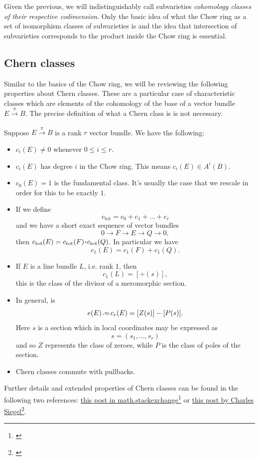 \documentclass[12pt]{memoir}
\begin{document}
Given the previous, we will indistinguishably call subvarieties \emph{cohomology classes of their respective codimension}. Only the basic idea of what the Chow ring as a set of isomorphism classes of subvarieties is and the idea that intersection of subvarieties corresponds to the product inside the Chow ring is essential.

\subsection{Chern classes}

Similar to the basics of the Chow ring, we will be reviewing the following properties about Chern classes. These are a particular case of characteristic classes which are elements of the cohomology of the base of a vector bundle $E\xrightarrow[]{\pi}B$. The precise definition of what a Chern class is is not necessary. 

\begin{Th}\label{th-chern-class-cheat-sheet}
    Suppose $E\xrightarrow{\pi}B$ is a rank $r$ vector bundle. We have the following:
\begin{itemize}
    \item $c_i(E)\neq 0$ whenever $0\leq i\leq r$.
    \item $c_i(E)$ has degree $i$ in the Chow ring. This means $c_i(E)\in A^i(B)$.
    \item $c_0(E)=1$ is the fundamental class. It's usually the case that we rescale in order for this to be exactly $1$.
    \item If we define 
    $$c_{\text{tot}}=c_0+c_1+\dots+c_r$$
    and we have a short exact sequence of vector bundles 
    $$0\to F\to E\to Q\to 0,$$
    then $c_{\text{tot}}(E)=c_{\text{tot}}(F)\.c_{\text{tot}}(Q)$. In particular we have 
    $$c_1(E)=c_1(F)+c_1(Q).$$
    \item If $E$ is a line bundle $L$, i.e. rank 1, then 
    $$c_1(L)=[\div(s)],$$
    this is the class of the divisor of a meromorphic section.
    \item In general,  is
    $$e(E)\defeq c_r(E)=[Z(s)]-[P(s)].$$%
    Here $s$ is a section which in local coordinates may be expressed as 
    $$s=(s_1,...,s_r)$$
    and so $Z$ represents the class of zeroes, while $P$ is the class of poles of the section.
    \item Chern classes commute with pullbacks.
\end{itemize}

Further details and extended properties of Chern classes can be found in the following two references: \href{https://math.stackexchange.com/questions/989147/}{this post in math.stackexchange}\footnote{\href{math.stackexchange.com/q/989147/}{}} or \href{https://rigtriv.wordpress.com/2009/11/03/chern-classes-part-1/}{this post by Charles Siegel}\footnote{\href{https://rigtriv.wordpress.com/2009/11/03/chern-classes-part-1/}{}}.

\end{Th}
\end{document}
